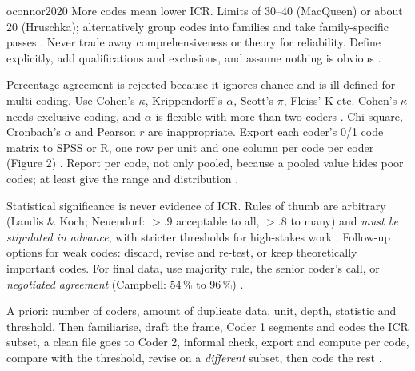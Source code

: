 \begin{papercard}{oconnor2020}
 More codes mean lower ICR. Limits of 30--40 (MacQueen) or about 20 (Hruschka); alternatively group codes into families and take family-specific passes . Never trade away comprehensiveness or theory for reliability. Define explicitly, add qualifications and exclusions, and assume nothing is obvious .

 Percentage agreement is rejected because it ignores chance and is ill-defined for multi-coding. Use Cohen's $\kappa$, Krippendorff's $\alpha$, Scott's $\pi$, Fleiss' K etc. Cohen's $\kappa$ needs exclusive coding, and $\alpha$ is flexible with more than two coders . Chi-square, Cronbach's $\alpha$ and Pearson $r$ are inappropriate. Export each coder's 0/1 code matrix to SPSS or R, one row per unit and one column per code per coder (Figure 2) . Report per code, not only pooled, because a pooled value hides poor codes; at least give the range and distribution .

 Statistical significance is never evidence of ICR. Rules of thumb are arbitrary (Landis \& Koch; Neuendorf: $>.9$ acceptable to all, $>.8$ to many) and \emph{must be stipulated in advance}, with stricter thresholds for high-stakes work . Follow-up options for weak codes: discard, revise and re-test, or keep theoretically important codes. For final data, use majority rule, the senior coder's call, or \emph{negotiated agreement} (Campbell: 54\,\% to 96\,\%) .

 A priori: number of coders, amount of duplicate data, unit, depth, statistic and threshold. Then familiarise, draft the frame, Coder 1 segments and codes the ICR subset, a clean file goes to Coder 2, informal check, export and compute per code, compare with the threshold, revise on a \emph{different} subset, then code the rest .


\end{papercard}
